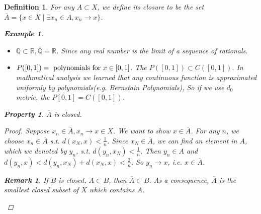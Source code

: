 \documentclass{article}
\newtheorem*{property}{Property}
\newtheorem*{definition}{Definition}
\newtheorem*{remark}{Remark}
\newtheorem*{example}{Example}
\begin{document}
\begin{definition}
    For any $A \subset X$, we define its closure to be the set 
    $\overline{A} = \{x \in X \mid \exists x_n \in A, x_n \rightarrow x\}$.
    \begin{example} \hfill
        \begin{itemize}
            \item $\mathbb{Q} \subset \mathbb{R}, \overline{\mathbb{Q}} = \mathbb{R}$.
            Since any real number is the limit of a sequence of rationals.
            \item $P([0, 1]) = \textnormal{ polynomials for } x \in [0, 1]$.
            The $P([0, 1]) \subset C([0, 1])$.
            In mathmatical analysis we learned that any continuous function is approximated uniformly by polynomials(e.g. Bernstain Polynomials),
            So if we use $d_0$ metric, the $\overline{P[0, 1]}=C([0,1])$.
        \end{itemize}
    \end{example}
    \begin{property}
        $\overline{A}$ is closed.
        \begin{proof}
            Suppose $x_n \in \overline{A}, x_n \rightarrow x \in X$. We want to show $x \in \overline{A}$.
            For any $n$, we choose $x_n \in \overline{A}$ s.t. $d(x_N, x) < \frac{1}{n}$.
            Since $x_N \in \overline{A}$, we can find an element in $A$,
            which we denoted by $y_n$, s.t. $d(y_n, x_N) < \frac{1}{n}$.
            Then $y_n \in A$ and $d(y_n, x) < d(y_n, x_N) + d(x_N, x) < \frac{2}{n}$.
            So $y_n \rightarrow x$, i.e. $x \in \overline{A}$.
            \begin{remark}
                If $B$ is closed, $A \subset B$, then $\overline{A} \subset B$.
                As a consequence, $\overline{A}$ is the smallest closed subset of $X$ which contains $A$.
            \end{remark}
        \end{proof}
    \end{property}
\end{definition}
\end{document}
